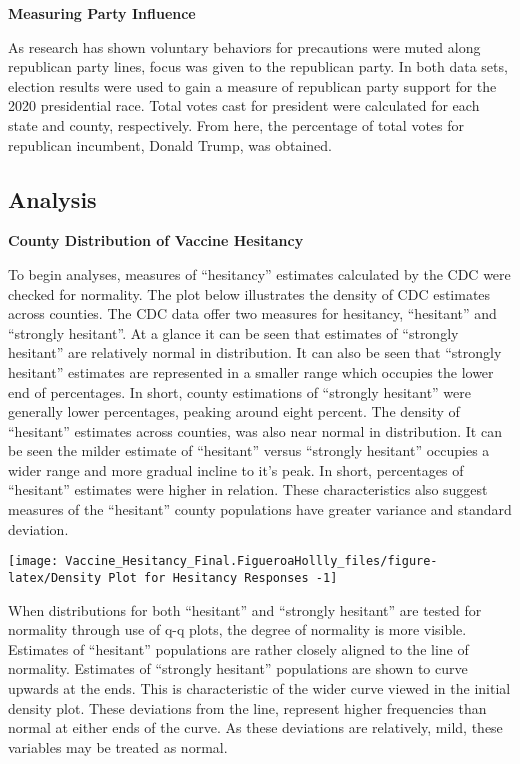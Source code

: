 \documentclass[
]{article}
\begin{document}
\textbf{Measuring Party Influence}

As research has shown voluntary behaviors for precautions were muted
along republican party lines, focus was given to the republican party.
In both data sets, election results were used to gain a measure of
republican party support for the 2020 presidential race. Total votes
cast for president were calculated for each state and county,
respectively. From here, the percentage of total votes for republican
incumbent, Donald Trump, was obtained.

\hypertarget{analysis}{%
\subsection{Analysis}\label{analysis}}

\textbf{County Distribution of Vaccine Hesitancy}

To begin analyses, measures of ``hesitancy'' estimates calculated by the
CDC were checked for normality. The plot below illustrates the density
of CDC estimates across counties. The CDC data offer two measures for
hesitancy, ``hesitant'' and ``strongly hesitant''. At a glance it can be
seen that estimates of ``strongly hesitant'' are relatively normal in
distribution. It can also be seen that ``strongly hesitant'' estimates
are represented in a smaller range which occupies the lower end of
percentages. In short, county estimations of ``strongly hesitant'' were
generally lower percentages, peaking around eight percent. The density
of ``hesitant'' estimates across counties, was also near normal in
distribution. It can be seen the milder estimate of ``hesitant'' versus
``strongly hesitant'' occupies a wider range and more gradual incline to
it's peak. In short, percentages of ``hesitant'' estimates were higher
in relation. These characteristics also suggest measures of the
``hesitant'' county populations have greater variance and standard
deviation.

\texttt{[image: Vaccine\_Hesitancy\_Final.FigueroaHollly\_files/figure-latex/Density Plot for Hesitancy Responses -1]}

When distributions for both ``hesitant'' and ``strongly hesitant'' are
tested for normality through use of q-q plots, the degree of normality
is more visible. Estimates of ``hesitant'' populations are rather
closely aligned to the line of normality. Estimates of ``strongly
hesitant'' populations are shown to curve upwards at the ends. This is
characteristic of the wider curve viewed in the initial density plot.
These deviations from the line, represent higher frequencies than normal
at either ends of the curve. As these deviations are relatively, mild,
these variables may be treated as normal. \newline
\end{document}
